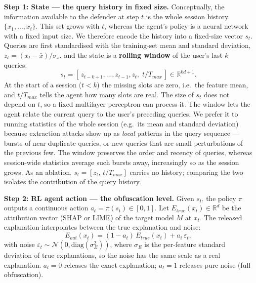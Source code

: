 \documentclass[conference]{IEEEtran}
\begin{document}
\textbf{Step 1: State --- the query history in fixed size.}\label{sec:state}
Conceptually, the information available to the defender at step $t$ is the whole session history $\{x_1,\dots,x_t\}$. This set grows with $t$, whereas the agent's policy is a neural network with a fixed input size. We therefore encode the history into a fixed-size vector $s_t$. Queries are first standardised with the training-set mean and standard deviation, $z_t = (x_t-\bar{x})/\sigma_x$, and the state is a \textbf{rolling window} of the user's last $k$ queries:
\begin{equation}
s_t = \left[\, z_{t-k+1}, \dots, z_{t-1}, z_t,\; t/T_{max} \,\right] \in \mathbb{R}^{kd+1}.
\label{eq:state_window}
\end{equation}
At the start of a session ($t<k$) the missing slots are zero, i.e.\ the feature mean, and $t/T_{max}$ tells the agent how many slots are real. The size of $s_t$ does not depend on $t$, so a fixed multilayer perceptron can process it. The window lets the agent relate the current query to the user's preceding queries. We prefer it to running statistics of the whole session (e.g.\ its mean and standard deviation) because extraction attacks show up as \emph{local} patterns in the query sequence --- bursts of near-duplicate queries, or new queries that are small perturbations of the previous few. The window preserves the order and recency of queries, whereas session-wide statistics average such bursts away, increasingly so as the session grows. As an ablation, $s_t=[z_t,\,t/T_{max}]$ carries no history; comparing the two isolates the contribution of the query history.

\textbf{Step 2: RL agent action --- the obfuscation level.}
Given $s_t$, the policy $\pi$ outputs a continuous action $a_t=\pi(s_t)\in[0,1]$. Let $E_{true}(x_t)\in\mathbb{R}^d$ be the attribution vector (SHAP or LIME) of the target model $M$ at $x_t$. The released explanation interpolates between the true explanation and noise:
\begin{equation}
E_{out}(x_t) = (1-a_t)\,E_{true}(x_t) + a_t\,\varepsilon_t,
\label{eq:obfuscation}
\end{equation}
with noise $\varepsilon_t\sim\mathcal{N}\!\left(0,\mathrm{diag}(\sigma_E^2)\right)$, where $\sigma_E$ is the per-feature standard deviation of true explanations, so the noise has the same scale as a real explanation. $a_t=0$ releases the exact explanation; $a_t=1$ releases pure noise (full obfuscation).
\end{document}
